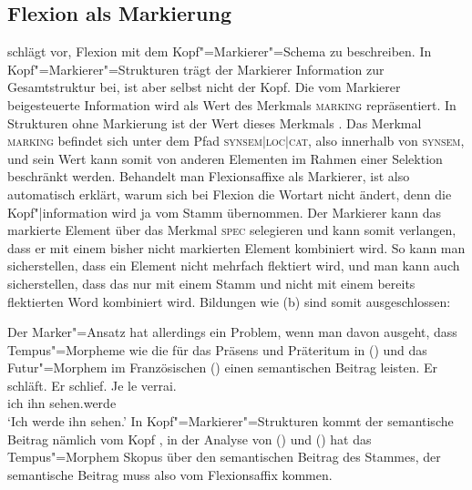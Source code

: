 \subsection{Flexion als Markierung}
\label{sec-flex-mark}

 schlägt vor, Flexion mit dem Kopf"=Markierer"=Schema
\citep[]{ps2} zu beschreiben. In Kopf"=Markierer"=Strukturen trägt der Markierer Information
zur Gesamtstruktur bei, ist aber selbst nicht der Kopf. Die vom Markierer beigesteuerte Information
wird als Wert des Merkmals \textsc{marking} repräsentiert. In Strukturen ohne
Markierung ist der Wert dieses Merkmals . Das Merkmal \textsc{marking} befindet sich
unter dem Pfad \textsc{synsem$|$loc$|$cat}, also innerhalb von \textsc{synsem}, und sein Wert kann somit
von anderen Elementen im Rahmen einer Selektion beschränkt werden. Behandelt man Flexionsaffixe als
Markierer, ist also automatisch erklärt, warum sich bei Flexion die Wortart nicht ändert, denn die
Kopf"|information wird ja vom Stamm übernommen. Der Markierer kann das markierte Element über das
Merkmal \textsc{spec} selegieren und kann somit verlangen, dass er mit einem bisher nicht markierten
Element kombiniert wird. So kann man sicherstellen, dass ein Element nicht mehrfach flektiert wird,
und man kann auch sicherstellen, dass \zb das \bars nur mit einem Stamm und nicht mit einem bereits
flektierten Word kombiniert wird.  Bildungen wie (b) sind somit ausgeschlossen:

\eal
{}
\zl

\noindent
Der Marker"=Ansatz hat allerdings ein Problem, wenn man davon ausgeht, dass Tempus"=Morpheme
wie die für das Präsens und Präteritum in () und das Futur"=Morphem im Französischen
() einen semantischen Beitrag leisten.
\eal
\ex Er schläft.
\ex Er schlief.
\zl
\ea
\gll Je le verrai.\\
     ich ihn sehen.werde\\
\glt `Ich werde ihn sehen.'
\z
In Kopf"=Markierer"=Strukturen kommt der semantische Beitrag nämlich vom Kopf \citep[]{ps2}, in der Analyse
von () und () hat das Tempus"=Morphem Skopus über den semantischen Beitrag des Stammes,
der semantische Beitrag muss also vom Flexionsaffix kommen.


